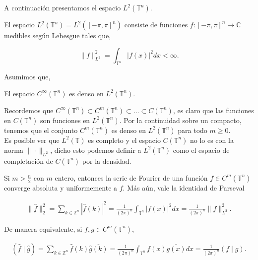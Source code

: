 \documentclass[12pt]{article}
\newcommand\T{\mathbb{T}}
\begin{document}
A continuación presentamos el espacio $L^2(\T^n)$.

\begin{definition}
El espacio $L^2\left(\mathbb{T}^n\right)=L^2\left([-\pi, \pi]^n\right)$ consiste de funciones $f:[-\pi, \pi]^n \rightarrow \mathbb{C}$ medibles según Lebesgue tales que,

$$\|f\|_{L^2}^2=\int_{\T^n}|f(x)|^2 d x<\infty.$$
\end{definition}
Asumimos que,
\begin{theorem}
El espacio $C^{\infty}\left(\mathbb{T}^n\right)$ es denso en $L^2\left(\mathbb{T}^n\right)$.    
\end{theorem}

\begin{note}
Recordemos que $C^{\infty}(\T^n)\subset C^m(\T^ n)\subset  \ldots\subset C(\T^n)$, es claro que las funciones en $C(\T^n)$ son funciones en $L^2(\T^n)$. Por la continuidad sobre un compacto, tenemos que el conjunto $C^m(\T^n)$ es denso en $L^2(\T^n)$ para todo $m\geq 0$.\\

Es posible ver que $L^2(\T)$ es completo y el espacio $C(\T^n)$ no lo es con  la norma $\|\cdot\|_{L^2}$, dicho esto podemos definir a $L^2(\T^n)$ como el espacio de completación de $C(\T^n)$ por la densidad.
\end{note}

\begin{theorem}\label{convergencia}
Si $m>\frac{n}{2}$ con $m$ entero, entonces la serie de Fourier de una función $f \in C^m\left(\mathbb{T}^n\right)$ converge absoluta y uniformemente a $f$. Más aún, vale la identidad de Parseval

\begin{align}
\|\widehat{f}\|_2^2=\sum_{k \in \mathbb{Z}^n}|\widehat{f}(k)|^2=\frac{1}{(2 \pi)^n} \int_{\T^n}|f(x)|^2 d x=\frac{1}{(2 \pi)^n}\|f\|_{L^2}^2.
\end{align}

De manera equivalente, si $f, g \in C^m\left(\mathbb{T}^n\right)$,

\begin{align}
(\widehat{f} \mid \widehat{g})=\sum_{k \in \mathbb{Z}^n} \widehat{f}(k) \overline{\widehat{g}(k)}=\frac{1}{(2 \pi)^n} \int_{\T^n} f(x) \overline{g(x)} d x=\frac{1}{(2 \pi)^n}(f \mid g).
\end{align}

\end{theorem}
\end{document}
